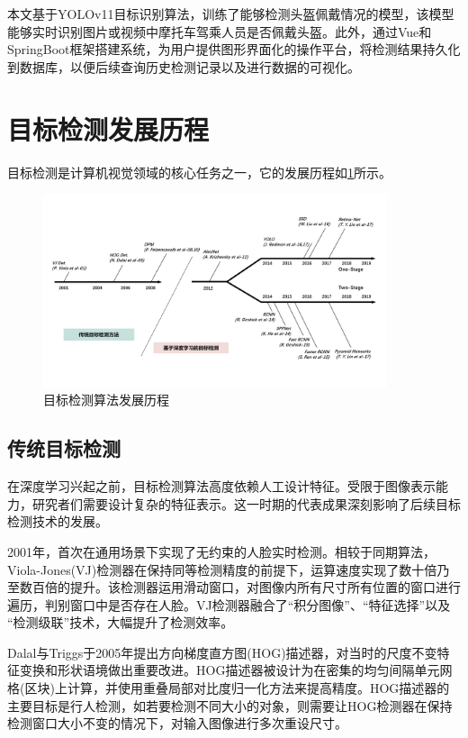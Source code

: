 本文基于YOLOv11目标识别算法，训练了能够检测头盔佩戴情况的模型，该模型能够实时识别图片或视频中摩托车驾乘人员是否佩戴头盔。此外，通过Vue和SpringBoot框架搭建系统，为用户提供图形界面化的操作平台，将检测结果持久化到数据库，以便后续查询历史检测记录以及进行数据的可视化。

\section{目标检测发展历程}

目标检测是计算机视觉领域的核心任务之一，它的发展历程如\ref{fig:his}所示。

\begin{figure}[!htb]
  \centering
  \includegraphics[width=0.9\textwidth]{figs/chap01/his.png}
  \caption{目标检测算法发展历程}
  \label{fig:his}
\end{figure}

\subsection{传统目标检测}
在深度学习兴起之前，目标检测算法高度依赖人工设计特征。受限于图像表示能力，研究者们需要设计复杂的特征表示。这一时期的代表成果深刻影响了后续目标检测技术的发展。

2001年，\textcite{Viola2001}首次在通用场景下实现了无约束的人脸实时检测。相较于同期算法，Viola-Jones(VJ)检测器在保持同等检测精度的前提下，运算速度实现了数十倍乃至数百倍的提升。该检测器运用滑动窗口，对图像内所有尺寸所有位置的窗口进行遍历，判别窗口中是否存在人脸。VJ检测器融合了“积分图像”、“特征选择”以及 “检测级联”技术，大幅提升了检测效率。

Dalal与Triggs于2005年提出方向梯度直方图(HOG)描述器，对当时的尺度不变特征变换和形状语境做出重要改进\cite{Dalal2005}。HOG描述器被设计为在密集的均匀间隔单元网格(区块)上计算，并使用重叠局部对比度归一化方法来提高精度。HOG描述器的主要目标是行人检测，如若要检测不同大小的对象，则需要让HOG检测器在保持检测窗口大小不变的情况下，对输入图像进行多次重设尺寸。

